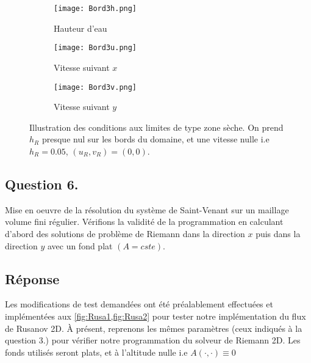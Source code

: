 \documentclass[
	french,
	11pt, %
]{fphw}
\begin{document}
\begin{figure}[H]
	\centering
	\begin{subfigure}{0.32\textwidth}
		\centering
		\texttt{[image: Bord3h.png]}
		\caption{Hauteur d'eau}
		\label{fig:Bord3h}
	\end{subfigure}
	\begin{subfigure}{0.32\textwidth}
		\centering
		\texttt{[image: Bord3u.png]}
		\caption{Vitesse suivant $x$}
		\label{fig:Bord3u}
	\end{subfigure}
	\begin{subfigure}{0.32\textwidth}
		\centering
		\texttt{[image: Bord3v.png]}
		\caption{Vitesse suivant $y$}
		\label{fig:Bord3v}
	\end{subfigure}
	\caption{Illustration des conditions aux limites de type zone sèche. On prend $h_R$ presque nul sur les bords du domaine, et une vitesse nulle i.e $h_R=0.05$, $(u_R,v_R)=(0,0)$.}
	\label{fig:Bord3}
\end{figure}


\subsection*{Question 6.}

\begin{problem}
	Mise en oeuvre de la résolution du système de Saint-Venant sur un maillage volume fini régulier. Vérifions la validité de la programmation en calculant d'abord des solutions de problème de Riemann dans la direction $x$ puis dans la direction $y$ avec un fond plat $(A = cste)$.
\end{problem}

\subsection*{Réponse} 

Les modifications de test demandées ont été préalablement effectuées et implémentées aux \cref{fig:Rusa1,fig:Rusa2} pour tester notre implémentation du flux de Rusanov 2D. À présent, reprenons les mêmes paramètres (ceux indiqués à la question 3.) pour vérifier notre programmation du solveur de Riemann 2D. Les fonds utilisés seront plats, et à l'altitude nulle i.e $A(\cdot,\cdot) \equiv 0$
\end{document}
